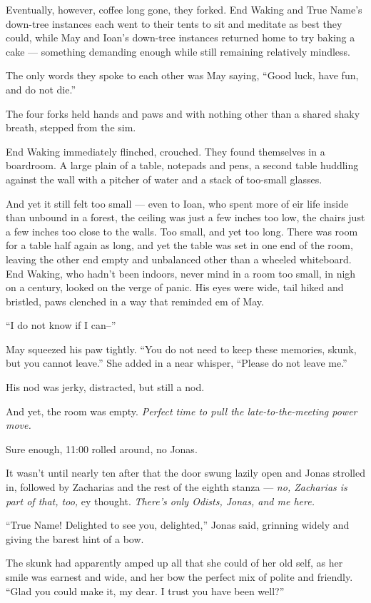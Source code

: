 Eventually, however, coffee long gone, they forked. End Waking and True Name's down-tree instances each went to their tents to sit and meditate as best they could, while May and Ioan's down-tree instances returned home to try baking a cake — something demanding enough while still remaining relatively mindless.

The only words they spoke to each other was May saying, ``Good luck, have fun, and do not die.''

The four forks held hands and paws and with nothing other than a shared shaky breath, stepped from the sim.

End Waking immediately flinched, crouched. They found themselves in a boardroom. A large plain of a table, notepads and pens, a second table huddling against the wall with a pitcher of water and a stack of too-small glasses.

And yet it still felt too small — even to Ioan, who spent more of eir life inside than unbound in a forest, the ceiling was just a few inches too low, the chairs just a few inches too close to the walls. Too small, and yet too long. There was room for a table half again as long, and yet the table was set in one end of the room, leaving the other end empty and unbalanced other than a wheeled whiteboard. End Waking, who hadn't been indoors, never mind in a room too small, in nigh on a century, looked on the verge of panic. His eyes were wide, tail hiked and bristled, paws clenched in a way that reminded em of May.

``I do not know if I can--''

May squeezed his paw tightly. ``You do not need to keep these memories, skunk, but you cannot leave.'' She added in a near whisper, ``Please do not leave me.''

His nod was jerky, distracted, but still a nod.

And yet, the room was empty. \emph{Perfect time to pull the late-to-the-meeting power move.}

Sure enough, 11:00 rolled around, no Jonas.

It wasn't until nearly ten after that the door swung lazily open and Jonas strolled in, followed by Zacharias and the rest of the eighth stanza — \emph{no, Zacharias is part of that, too,} ey thought. \emph{There's only Odists, Jonas, and me here.}

``True Name! Delighted to see you, delighted,'' Jonas said, grinning widely and giving the barest hint of a bow.

The skunk had apparently amped up all that she could of her old self, as her smile was earnest and wide, and her bow the perfect mix of polite and friendly. ``Glad you could make it, my dear. I trust you have been well?''

